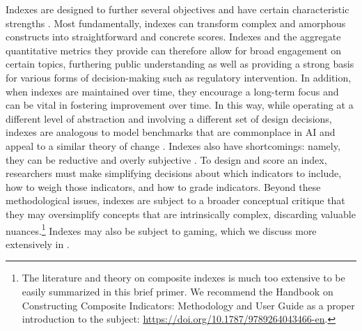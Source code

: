Indexes are designed to further several objectives and have certain characteristic strengths \citep{joint2008handbook, saisana2002state}. 
Most fundamentally, indexes can transform complex and amorphous constructs into straightforward and concrete scores.
Indexes and the aggregate quantitative metrics they provide can therefore allow for broad engagement on certain topics, furthering public understanding as well as providing a strong basis for various forms of decision-making  such as regulatory intervention. 
In addition, when indexes are maintained over time, they encourage a long-term focus and can be vital in fostering improvement over time.
In this way, while operating at a different level of abstraction and involving a different set of design decisions, indexes are analogous to model benchmarks that are commonplace in AI \citep{deng2009imagenet, wang2019superglue, liang2023holistic} and appeal to a similar theory of change \citep{donoho2017fifty, ethayarajh2020utility, raji2021benchmark, bommasani2022evaluation}.
Indexes also have shortcomings: namely, they can be reductive and overly subjective \citep{saisana2002state, oecd2008handbook, greco2019methodological}.
To design and score an index, researchers must make simplifying decisions about which indicators to include, how to weigh those indicators, and how to grade indicators.
Beyond these methodological issues, indexes are subject to a broader conceptual critique that they may oversimplify concepts that are intrinsically complex, discarding valuable nuances.\footnote{The literature and theory on composite indexes is much too extensive to be easily summarized in this brief primer.
We recommend the Handbook on Constructing Composite Indicators: Methodology and User Guide \citep{oecd2008handbook} as a proper introduction to the subject: \url{https://doi.org/10.1787/9789264043466-en}.} 
Indexes may also be subject to gaming, which we discuss more extensively in .
\clearpage

